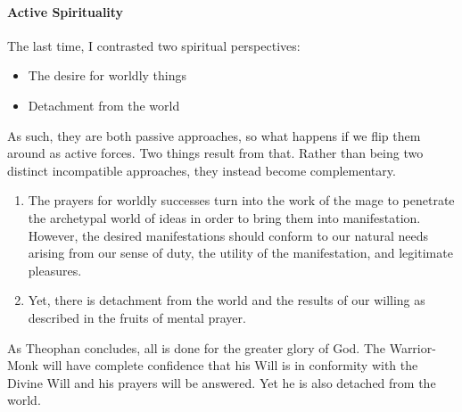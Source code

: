 \paragraph{Active Spirituality}
The last time, I contrasted two spiritual perspectives:

\begin{itemize}
\item The desire for worldly things 
\item Detachment from the world 
\end{itemize}
As such, they are both passive approaches, so what happens if we flip them around as active forces. Two things result from that. Rather than being two distinct incompatible approaches, they instead become complementary.

\begin{enumerate}
\item The prayers for worldly successes turn into the work of the mage to penetrate the archetypal world of ideas in order to bring them into manifestation. However, the desired manifestations should conform to our natural needs arising from our sense of duty, the utility of the manifestation, and legitimate pleasures. 
\item Yet, there is detachment from the world and the results of our willing as described in the fruits of mental prayer. 
\end{enumerate}
As Theophan concludes, all is done for the greater glory of God. The Warrior-Monk will have complete confidence that his Will is in conformity with the Divine Will and his prayers will be answered. Yet he is also detached from the world.

